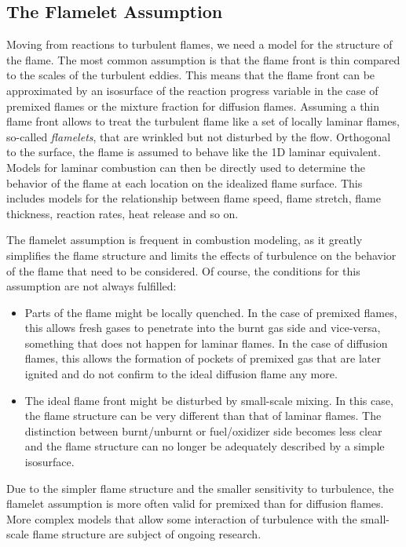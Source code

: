\subsection{The Flamelet Assumption} %
\label{sub:the_flamelet_assumption}
%
Moving from reactions to turbulent flames, we need a model for the structure
of the flame.
%
The most common assumption is that the flame front is thin compared to the
scales of the turbulent eddies.
%
This means that the flame front can be approximated by an isosurface of the
reaction progress variable in the case of premixed flames or the mixture
fraction for diffusion flames.
%
Assuming a thin flame front allows to treat the turbulent flame like a set of
locally laminar flames, so-called \emph{flamelets}, that are wrinkled but not
disturbed by the flow.
%
Orthogonal to the surface, the flame is assumed to behave like the
\ac{1D} laminar equivalent.
%
Models for laminar combustion can then be directly used to determine the
behavior of the flame at each location on the idealized flame surface.
%
This includes models for the relationship between flame speed, flame stretch,
flame thickness, reaction rates, heat release and so on.
%

%
The flamelet assumption is frequent in combustion modeling, as it greatly
simplifies the flame structure and limits the effects of turbulence on the
behavior of the flame that need to be considered.
%
Of course, the conditions for this assumption are not always fulfilled:
%
\begin{itemize}
    \item
    Parts of the flame might be locally quenched.
    In the case of premixed flames, this allows fresh gases to penetrate into
    the burnt gas side and vice-versa, something that does not happen for
    laminar flames.
    In the case of diffusion flames, this allows the formation of pockets of
    premixed gas that are later ignited and do not confirm to the ideal
    diffusion flame any more.
    \item
    The ideal flame front might be disturbed by small-scale mixing.
    In this case, the flame structure can be very different than that of laminar
    flames.
    The distinction between burnt/unburnt or fuel/oxidizer side becomes less
    clear and the flame structure can no longer be adequately described by a
    simple isosurface.
\end{itemize}
%
Due to the simpler flame structure and the smaller sensitivity to turbulence,
the flamelet assumption is more often valid for premixed than for diffusion
flames.
%
More complex models that allow some interaction of turbulence with the
small-scale flame structure are subject of ongoing research.
%
%
